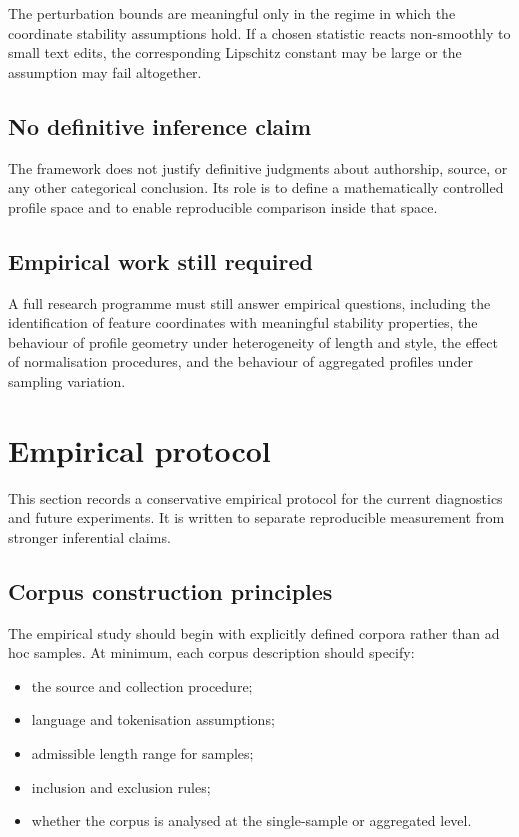 \documentclass[11pt]{article}
\begin{document}
The perturbation bounds are meaningful only in the regime in which the coordinate stability assumptions hold. If a chosen statistic reacts non-smoothly to small text edits, the corresponding Lipschitz constant may be large or the assumption may fail altogether.

\subsection{No definitive inference claim}

The framework does not justify definitive judgments about authorship, source, or any other categorical conclusion. Its role is to define a mathematically controlled profile space and to enable reproducible comparison inside that space.

\subsection{Empirical work still required}

A full research programme must still answer empirical questions, including the identification of feature coordinates with meaningful stability properties, the behaviour of profile geometry under heterogeneity of length and style, the effect of normalisation procedures, and the behaviour of aggregated profiles under sampling variation.

\section{Empirical protocol}

This section records a conservative empirical protocol for the current diagnostics and future experiments. It is written to separate reproducible measurement from stronger inferential claims.

\subsection{Corpus construction principles}

The empirical study should begin with explicitly defined corpora rather than ad hoc samples. At minimum, each corpus description should specify:
\begin{itemize}
    \item the source and collection procedure;
    \item language and tokenisation assumptions;
    \item admissible length range for samples;
    \item inclusion and exclusion rules;
    \item whether the corpus is analysed at the single-sample or aggregated level.
\end{itemize}
\end{document}
